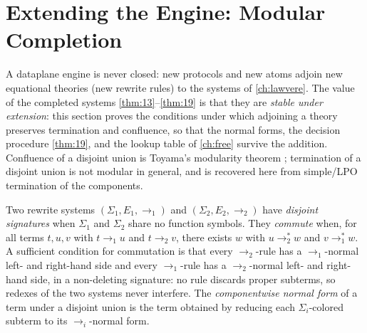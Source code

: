 \section{Extending the Engine: Modular Completion}\label{sec:rewrite-modular}

A dataplane engine is never closed: new protocols and new atoms adjoin
new equational theories (new rewrite rules) to the systems of
\autoref{ch:lawvere}. The value of the completed systems
\ref{thm:13}--\ref{thm:19} is that they are \emph{stable under extension}:
this section proves the conditions under which adjoining a theory
preserves termination and confluence, so that the normal forms, the
decision procedure \ref{thm:19}, and the lookup table of \autoref{ch:free}
survive the addition. Confluence of a disjoint union is Toyama's
modularity theorem \citep{toyama}; termination of a disjoint union is
not modular in general, and is recovered here from simple/LPO
termination of the components.

\begin{definition}\label{def:modular}
Two rewrite systems $(\Sigma_1, E_1, \to_1)$ and $(\Sigma_2, E_2, \to_2)$
have \emph{disjoint signatures} when $\Sigma_1$ and $\Sigma_2$ share no
function symbols. They \emph{commute} when, for all terms $t, u, v$ with
$t \to_1 u$ and $t \to_2 v$, there exists $w$ with $u \to_2^* w$ and
$v \to_1^* w$. A sufficient condition for commutation is that every
$\to_2$-rule has a $\to_1$-normal left- and right-hand side and every
$\to_1$-rule has a $\to_2$-normal left- and right-hand side, in a
non-deleting signature: no rule discards proper subterms, so redexes of
the two systems never interfere. The \emph{componentwise normal form}
of a term under a disjoint union is the term obtained by reducing each
$\Sigma_i$-colored subterm to its $\to_i$-normal form.
\end{definition}


